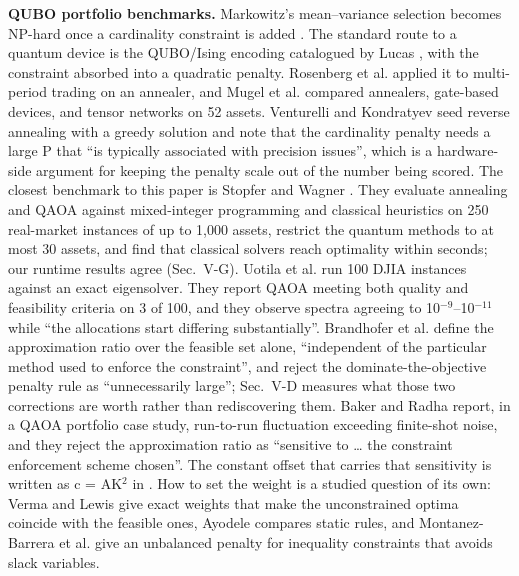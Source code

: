 \documentclass[journal]{IEEEtran}
\begin{document}
\textbf{QUBO portfolio benchmarks.} Markowitz's mean--variance selection \cite{ref1} becomes NP-hard once a cardinality constraint is added \cite{ref2}. The standard route to a quantum device is the QUBO/Ising encoding catalogued by Lucas \cite{ref3}, with the constraint absorbed into a quadratic penalty. Rosenberg et al. \cite{ref15} applied it to multi-period trading on an annealer, and Mugel et al. \cite{ref16} compared annealers, gate-based devices, and tensor networks on 52 assets. Venturelli and Kondratyev \cite{ref17} seed reverse annealing with a greedy solution and note that the cardinality penalty needs a large P that ``is typically associated with precision issues'', which is a hardware-side argument for keeping the penalty scale out of the number being scored. The closest benchmark to this paper is Stopfer and Wagner \cite{ref13}. They evaluate annealing and QAOA against mixed-integer programming and classical heuristics on 250 real-market instances of up to 1,000 assets, restrict the quantum methods to at most 30 assets, and find that classical solvers reach optimality within seconds; our runtime results agree (Sec.~V-G). Uotila et al. \cite{ref18} run 100 DJIA instances against an exact eigensolver. They report QAOA meeting both quality and feasibility criteria on 3 of 100, and they observe spectra agreeing to 10$^{-9}$--10$^{-11}$ while ``the allocations start differing substantially''. Brandhofer et al. \cite{ref8} define the approximation ratio over the feasible set alone, ``independent of the particular method used to enforce the constraint'', and reject the dominate-the-objective penalty rule as ``unnecessarily large''; Sec.~V-D measures what those two corrections are worth rather than rediscovering them. Baker and Radha \cite{ref9} report, in a QAOA portfolio case study, run-to-run fluctuation exceeding finite-shot noise, and they reject the approximation ratio as ``sensitive to \ldots{} the constraint enforcement scheme chosen''. The constant offset that carries that sensitivity is written as c = AK$^{2}$ in \cite{ref10}. How to set the weight is a studied question of its own: Verma and Lewis \cite{ref19} give exact weights that make the unconstrained optima coincide with the feasible ones, Ayodele \cite{ref20} compares static rules, and Montanez-Barrera et al. \cite{ref21} give an unbalanced penalty for inequality constraints that avoids slack variables.
\end{document}
